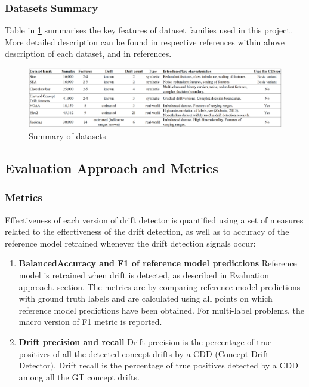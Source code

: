 \documentclass{svproc}
\begin{document}
\subsubsection{Datasets Summary}Table in \ref{fig:fig10} summarises the key features of dataset families used in this project. More detailed description can be found in respective references within above description of each dataset, and in references.
\begin{figure}
	\centering
	\includegraphics[scale=.7]{figures/Fig10_dataset_summary.png}
	\caption{Summary of datasets}
	\label{fig:fig10}
\end{figure}

\subsection{Evaluation Approach and Metrics}

\subsubsection{Metrics} Effectiveness of each version of drift detector is quantified using a set of measures related to the effectiveness of the drift detection, as well as to accuracy of the reference model retrained whenever the drift detection signals occur:
\begin{enumerate}
	\item \textbf{BalancedAccuracy and F1 of reference model predictions} Reference model is retrained when drift is detected, as described in Evaluation approach. section. The metrics are by comparing reference model predictions with ground truth labels and are calculated using all points on which reference model predictions have been obtained. For multi-label problems, the macro version of F1 metric is reported.
	\item \textbf{Drift precision and recall} Drift precision is the percentage of true positives of all the detected concept drifts by a CDD (Concept Drift Detector). Drift recall is the percentage of true positives detected by a CDD among all the GT concept drifts. 
\end{enumerate}
\end{document}
